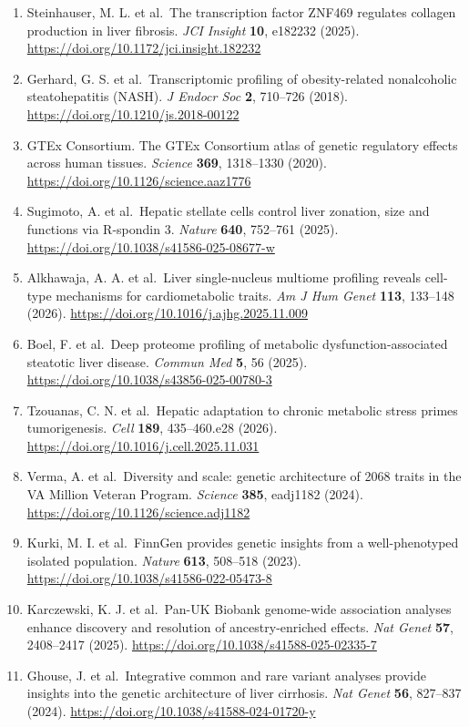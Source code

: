 \begin{enumerate}
\item
  Steinhauser, M. L. et al.~The transcription factor ZNF469 regulates collagen production in liver fibrosis. \emph{JCI Insight} \textbf{10}, e182232 (2025). \url{https://doi.org/10.1172/jci.insight.182232}
\item
  Gerhard, G. S. et al.~Transcriptomic profiling of obesity-related nonalcoholic steatohepatitis (NASH). \emph{J Endocr Soc} \textbf{2}, 710--726 (2018). \url{https://doi.org/10.1210/js.2018-00122}
\item
  GTEx Consortium. The GTEx Consortium atlas of genetic regulatory effects across human tissues. \emph{Science} \textbf{369}, 1318--1330 (2020). \url{https://doi.org/10.1126/science.aaz1776}
\item
  Sugimoto, A. et al.~Hepatic stellate cells control liver zonation, size and functions via R-spondin 3. \emph{Nature} \textbf{640}, 752--761 (2025). \url{https://doi.org/10.1038/s41586-025-08677-w}
\item
  Alkhawaja, A. A. et al.~Liver single-nucleus multiome profiling reveals cell-type mechanisms for cardiometabolic traits. \emph{Am J Hum Genet} \textbf{113}, 133--148 (2026). \url{https://doi.org/10.1016/j.ajhg.2025.11.009}
\item
  Boel, F. et al.~Deep proteome profiling of metabolic dysfunction-associated steatotic liver disease. \emph{Commun Med} \textbf{5}, 56 (2025). \url{https://doi.org/10.1038/s43856-025-00780-3}
\item
  Tzouanas, C. N. et al.~Hepatic adaptation to chronic metabolic stress primes tumorigenesis. \emph{Cell} \textbf{189}, 435--460.e28 (2026). \url{https://doi.org/10.1016/j.cell.2025.11.031}
\item
  Verma, A. et al.~Diversity and scale: genetic architecture of 2068 traits in the VA Million Veteran Program. \emph{Science} \textbf{385}, eadj1182 (2024). \url{https://doi.org/10.1126/science.adj1182}
\item
  Kurki, M. I. et al.~FinnGen provides genetic insights from a well-phenotyped isolated population. \emph{Nature} \textbf{613}, 508--518 (2023). \url{https://doi.org/10.1038/s41586-022-05473-8}
\item
  Karczewski, K. J. et al.~Pan-UK Biobank genome-wide association analyses enhance discovery and resolution of ancestry-enriched effects. \emph{Nat Genet} \textbf{57}, 2408--2417 (2025). \url{https://doi.org/10.1038/s41588-025-02335-7}
\item
  Ghouse, J. et al.~Integrative common and rare variant analyses provide insights into the genetic architecture of liver cirrhosis. \emph{Nat Genet} \textbf{56}, 827--837 (2024). \url{https://doi.org/10.1038/s41588-024-01720-y}

\end{enumerate}
